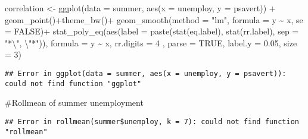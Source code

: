 \documentclass[
]{article}
\newenvironment{Shaded}{\begin{snugshade}}{\end{snugshade}}
\newcommand{\AttributeTok}[1]{\textcolor[rgb]{0.77,0.63,0.00}{#1}}
\newcommand{\ConstantTok}[1]{\textcolor[rgb]{0.00,0.00,0.00}{#1}}
\newcommand{\DecValTok}[1]{\textcolor[rgb]{0.00,0.00,0.81}{#1}}
\newcommand{\FloatTok}[1]{\textcolor[rgb]{0.00,0.00,0.81}{#1}}
\newcommand{\FunctionTok}[1]{\textcolor[rgb]{0.00,0.00,0.00}{#1}}
\newcommand{\NormalTok}[1]{#1}
\newcommand{\OtherTok}[1]{\textcolor[rgb]{0.56,0.35,0.01}{#1}}
\newcommand{\SpecialCharTok}[1]{\textcolor[rgb]{0.00,0.00,0.00}{#1}}
\newcommand{\StringTok}[1]{\textcolor[rgb]{0.31,0.60,0.02}{#1}}
\begin{document}
\begin{Shaded}
\begin{Highlighting}[]
\NormalTok{correlation }\OtherTok{\textless{}{-}} \FunctionTok{ggplot}\NormalTok{(}\AttributeTok{data =}\NormalTok{ summer, }\FunctionTok{aes}\NormalTok{(}\AttributeTok{x =}\NormalTok{ unemploy, }\AttributeTok{y =}\NormalTok{ psavert)) }\SpecialCharTok{+} \FunctionTok{geom\_point}\NormalTok{()}\SpecialCharTok{+}\FunctionTok{theme\_bw}\NormalTok{()}\SpecialCharTok{+}
  \FunctionTok{geom\_smooth}\NormalTok{(}\AttributeTok{method =} \StringTok{"lm"}\NormalTok{, }\AttributeTok{formula =}\NormalTok{ y }\SpecialCharTok{\textasciitilde{}}\NormalTok{ x, }\AttributeTok{se =} \ConstantTok{FALSE}\NormalTok{)}\SpecialCharTok{+}
  \FunctionTok{stat\_poly\_eq}\NormalTok{(}\FunctionTok{aes}\NormalTok{(}\AttributeTok{label =}  \FunctionTok{paste}\NormalTok{(}\FunctionTok{stat}\NormalTok{(eq.label), }\FunctionTok{stat}\NormalTok{(rr.label), }\AttributeTok{sep =} \StringTok{"*}\SpecialCharTok{\textbackslash{}"}\StringTok{, }\SpecialCharTok{\textbackslash{}"}\StringTok{*"}\NormalTok{)),}
               \AttributeTok{formula =}\NormalTok{ y }\SpecialCharTok{\textasciitilde{}}\NormalTok{ x, }\AttributeTok{rr.digits =} \DecValTok{4}\NormalTok{ , }\AttributeTok{parse =} \ConstantTok{TRUE}\NormalTok{, }\AttributeTok{label.y =} \FloatTok{0.05}\NormalTok{, }\AttributeTok{size =} \DecValTok{3}\NormalTok{)}
\end{Highlighting}
\end{Shaded}

\begin{verbatim}
## Error in ggplot(data = summer, aes(x = unemploy, y = psavert)): could not find function "ggplot"
\end{verbatim}

\#Rollmean of summer unemployment

\begin{Shaded}
\end{Shaded}

\begin{verbatim}
## Error in rollmean(summer$unemploy, k = 7): could not find function "rollmean"
\end{verbatim}
\end{document}

